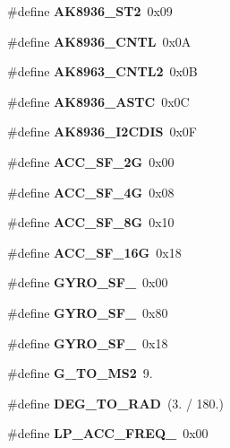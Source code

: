 \begin{DoxyCompactItemize}
\#define {\bfseries A\+K8936\+\_\+\+S\+T2}~0x09
\item 
\mbox{\label{_i_m_u__functions_8h_aaf1ccf81f01e11b6f97cbb1f56f9c31c}} 
\#define {\bfseries A\+K8936\+\_\+\+C\+N\+TL}~0x0A
\item 
\mbox{\label{_i_m_u__functions_8h_a22c3ba7c88d001a39b0f0d3c880c8993}} 
\#define {\bfseries A\+K8963\+\_\+\+C\+N\+T\+L2}~0x0B
\item 
\mbox{\label{_i_m_u__functions_8h_a951a7bb134f91b3966e4ab618a6db94d}} 
\#define {\bfseries A\+K8936\+\_\+\+A\+S\+TC}~0x0C
\item 
\mbox{\label{_i_m_u__functions_8h_a915e3e48f694500f0728e5c720134763}} 
\#define {\bfseries A\+K8936\+\_\+\+I2\+C\+D\+IS}~0x0F
\item 
\mbox{\label{_i_m_u__functions_8h_aba7d379977d1c4793eb8871c8ebc417a}} 
\#define {\bfseries A\+C\+C\+\_\+\+S\+F\+\_\+2G}~0x00
\item 
\mbox{\label{_i_m_u__functions_8h_ac9159339b9f5428ed16b7e794185e29f}} 
\#define {\bfseries A\+C\+C\+\_\+\+S\+F\+\_\+4G}~0x08
\item 
\mbox{\label{_i_m_u__functions_8h_ac9e0af9f1a9e4e07f306410e3c3a84d3}} 
\#define {\bfseries A\+C\+C\+\_\+\+S\+F\+\_\+8G}~0x10
\item 
\mbox{\label{_i_m_u__functions_8h_a08d2b56da01c25684a489faeb9a976e8}} 
\#define {\bfseries A\+C\+C\+\_\+\+S\+F\+\_\+16G}~0x18
\item 
\mbox{\label{_i_m_u__functions_8h_ae6de0bc596530ecf09f3da43529588d0}} 
\#define {\bfseries G\+Y\+R\+O\+\_\+\+S\+F\+\_}~0x00
\item 
\mbox{\label{_i_m_u__functions_8h_ad0973081208e9cfda92705d5f361446b}} 
\#define {\bfseries G\+Y\+R\+O\+\_\+\+S\+F\+\_}~0x80
\item 
\mbox{\label{_i_m_u__functions_8h_aa58d6861fcbbdc86f79c2920fbeafcc0}} 
\#define {\bfseries G\+Y\+R\+O\+\_\+\+S\+F\+\_}~0x18
\item 
\mbox{\label{_i_m_u__functions_8h_a1078273b65a944f3966c004fcbe7cb2c}} 
\#define {\bfseries G\+\_\+\+T\+O\+\_\+\+M\+S2}~9.
\item 
\mbox{\label{_i_m_u__functions_8h_a212460e743fecb084d717bb2180c5a56}} 
\#define {\bfseries D\+E\+G\+\_\+\+T\+O\+\_\+\+R\+AD}~(3. / 180.)
\item 
\mbox{\label{_i_m_u__functions_8h_a5bb0ced434ca6f04c04b22ad7dcc4c5d}} 
\#define {\bfseries L\+P\+\_\+\+A\+C\+C\+\_\+\+F\+R\+E\+Q\+\_}~0x00
\item 
\mbox{\label{_i_m_u__functions_8h_afba6f2fb7aa32b9f675692b1fa29384e}} 

\end{DoxyCompactItemize}
